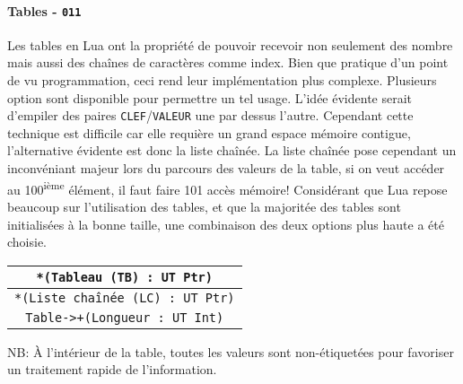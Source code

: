 \documentclass{article}
\begin{document}
\paragraph{Tables - \texttt{011}}
Les tables en Lua ont la propriété de pouvoir recevoir non seulement des nombre mais aussi des chaînes de caractères comme index. Bien que pratique d'un point de vu programmation, ceci rend leur implémentation plus complexe. Plusieurs option sont disponible pour permettre un tel usage. L'idée évidente serait d'empiler des paires \texttt{CLEF}/\texttt{VALEUR} une par dessus l'autre. Cependant cette technique est difficile car elle requière un grand espace mémoire contigue, l'alternative évidente est donc la liste chaînée. La liste chaînée pose cependant un inconvéniant majeur lors du parcours des valeurs de la table, si on veut accéder au 100\textsuperscript{ième} élément, il faut faire 101 accès mémoire! Considérant que Lua repose beaucoup sur l'utilisation des tables, et que la majoritée des tables sont initialisées à la bonne taille, une combinaison des deux options plus haute a été choisie.
\begin{center}
  \begin{tabular}{|c|}
    \hline
    \texttt{*(Tableau (TB) : UT Ptr)}\\
    \hline
    \texttt{*(Liste chaînée (LC) : UT Ptr)}\\
    \hline
    \texttt{Table->+(Longueur : UT Int)}\\
    \hline
  \end{tabular}
\end{center}
NB: À l'intérieur de la table, toutes les valeurs sont non-étiquetées pour favoriser un traitement rapide de l'information.
\end{document}
